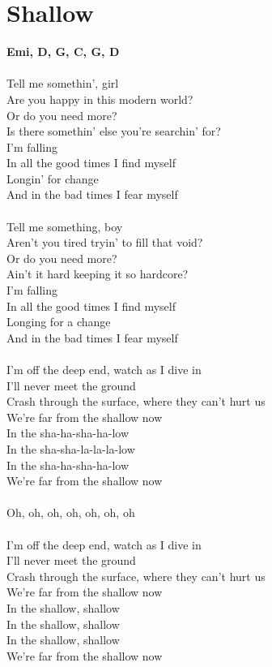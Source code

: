 \section{Shallow}
\footnotesize\textbf{Emi, D, G, C, G, D}\\
\\
\normalsize
\color{blue}
Tell me somethin', girl\\
Are you happy in this modern world?\\
Or do you need more?\\
Is there somethin' else you're searchin' for?\\
I'm falling\\
In all the good times I find myself\\
Longin' for change\\
And in the bad times I fear myself\\
\\
\color{red}
Tell me something, boy\\
Aren't you tired tryin' to fill that void?\\
Or do you need more?\\
Ain't it hard keeping it so hardcore?\\
I'm falling\\
In all the good times I find myself\\
Longing for a change\\
And in the bad times I fear myself\\
\\
I'm off the deep end, watch as I dive in\\
I'll never meet the ground\\
Crash through the surface, where they can't hurt us\\
We're far from the shallow now\\
\color{black}
In the sha-ha-sha-ha-low\\
In the sha-sha-la-la-la-low\\
In the sha-ha-sha-ha-low\\
We're far from the shallow now\\
\\
\color{red}
Oh, oh, oh, oh, oh, oh, oh\\
\\
I'm off the deep end, watch as I dive in\\
I'll never meet the ground\\
Crash through the surface, where they can't hurt us\\
We're far from the shallow now\\
\color{black}
In the shallow, shallow\\
In the shallow, shallow\\
In the shallow, shallow\\
We're far from the shallow now\\